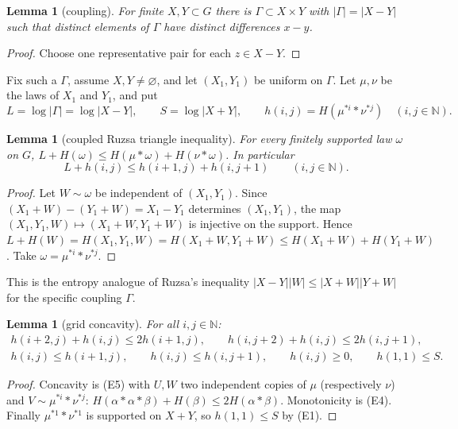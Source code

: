 \documentclass[11pt]{amsart}
\newtheorem{lemma}[theorem]{Lemma}
\theoremstyle{definition}
\theoremstyle{remark}
\numberwithin{equation}{section}
\newcommand{\N}{\mathbb{N}}
\begin{document}
\begin{lemma}[coupling]\label{lem:coupling}
For finite $X,Y\subset G$ there is $\Gamma\subset X\times Y$ with $|\Gamma|=|X-Y|$ such that
distinct elements of $\Gamma$ have distinct differences $x-y$.
\end{lemma}

\begin{proof}
Choose one representative pair for each $z\in X-Y$.
\end{proof}

Fix such a $\Gamma$, assume
$X,Y\ne\varnothing$, and let $(X_1,Y_1)$ be uniform on $\Gamma$. Let $\mu,\nu$ be the laws of $X_1$ and
$Y_1$, and put
\[
  L=\log|\Gamma|=\log|X-Y|,\qquad S=\log|X+Y|,\qquad h(i,j)=H(\mu^{*i}*\nu^{*j})\quad(i,j\in\N).
\]

\begin{lemma}[coupled Ruzsa triangle inequality]\label{lem:link}
For every finitely supported law $\omega$ on $G$,
$L+H(\omega)\le H(\mu*\omega)+H(\nu*\omega)$. In particular
\[
  L+h(i,j)\le h(i+1,j)+h(i,j+1)\qquad(i,j\in\N).
\]
\end{lemma}

\begin{proof}
Let $W\sim\omega$ be independent of $(X_1,Y_1)$. Since $(X_1+W)-(Y_1+W)=X_1-Y_1$ determines
$(X_1,Y_1)$, the map $(X_1,Y_1,W)\mapsto(X_1+W,Y_1+W)$ is injective on the support. Hence
$L+H(W)=H(X_1,Y_1,W)=H(X_1+W,Y_1+W)\le H(X_1+W)+H(Y_1+W)$. Take $\omega=\mu^{*i}*\nu^{*j}$.
\end{proof}

This is the entropy analogue of Ruzsa's inequality $|X-Y||W|\le|X+W||Y+W|$ for the specific
coupling $\Gamma$.

\begin{lemma}[grid concavity]\label{lem:grid}
For all $i,j\in\N$:
\begin{gather*}
 h(i+2,j)+h(i,j)\le2h(i+1,j),\qquad h(i,j+2)+h(i,j)\le2h(i,j+1),\\
 h(i,j)\le h(i+1,j),\qquad h(i,j)\le h(i,j+1),\qquad h(i,j)\ge0,\qquad h(1,1)\le S.
\end{gather*}
\end{lemma}

\begin{proof}
Concavity is (E5) with $U,W$ two independent copies of $\mu$ (respectively $\nu$) and
$V\sim\mu^{*i}*\nu^{*j}$: $H(\alpha*\alpha*\beta)+H(\beta)\le2H(\alpha*\beta)$. Monotonicity is (E4).
Finally $\mu^{*1}*\nu^{*1}$ is supported on $X+Y$, so $h(1,1)\le S$ by (E1).
\end{proof}
\end{document}
